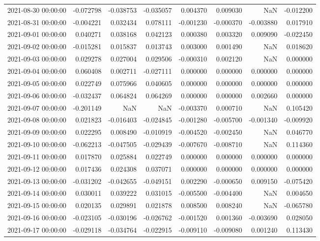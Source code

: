 \begin{tabular}{lrrrrrrr}
2021-08-30 00:00:00 & -0.072798 & -0.038753 & -0.035057 & 0.004370 & 0.009030 & NaN & -0.012200 \\
2021-08-31 00:00:00 & -0.004221 & 0.032434 & 0.078111 & -0.001230 & -0.000370 & -0.003880 & 0.017910 \\
2021-09-01 00:00:00 & 0.040271 & 0.038168 & 0.042123 & 0.000380 & 0.003320 & 0.009090 & -0.022450 \\
2021-09-02 00:00:00 & -0.015281 & 0.015837 & 0.013743 & 0.003000 & 0.001490 & NaN & 0.018620 \\
2021-09-03 00:00:00 & 0.029278 & 0.027004 & 0.029506 & -0.000310 & 0.002120 & NaN & 0.000000 \\
2021-09-04 00:00:00 & 0.060408 & 0.002711 & -0.027111 & 0.000000 & 0.000000 & 0.000000 & 0.000000 \\
2021-09-05 00:00:00 & 0.022749 & 0.075966 & 0.040605 & 0.000000 & 0.000000 & 0.000000 & 0.000000 \\
2021-09-06 00:00:00 & -0.032437 & 0.064824 & 0.064269 & 0.000000 & 0.000000 & 0.002660 & 0.000000 \\
2021-09-07 00:00:00 & -0.201149 & NaN & NaN & -0.003370 & 0.000710 & NaN & 0.105420 \\
2021-09-08 00:00:00 & 0.021823 & -0.016403 & -0.024845 & -0.001280 & -0.005700 & -0.001340 & -0.009920 \\
2021-09-09 00:00:00 & 0.022295 & 0.008490 & -0.010919 & -0.004520 & -0.002450 & NaN & 0.046770 \\
2021-09-10 00:00:00 & -0.062213 & -0.047505 & -0.029439 & -0.007670 & -0.008710 & NaN & 0.114360 \\
2021-09-11 00:00:00 & 0.017870 & 0.025884 & 0.022749 & 0.000000 & 0.000000 & 0.000000 & 0.000000 \\
2021-09-12 00:00:00 & 0.017436 & 0.024308 & 0.037071 & 0.000000 & 0.000000 & 0.000000 & 0.000000 \\
2021-09-13 00:00:00 & -0.031202 & -0.042655 & -0.049151 & 0.002290 & -0.000650 & 0.009150 & -0.075420 \\
2021-09-14 00:00:00 & 0.030011 & 0.039222 & 0.031015 & -0.005500 & -0.004400 & NaN & 0.004650 \\
2021-09-15 00:00:00 & 0.020135 & 0.029891 & 0.021878 & 0.008500 & 0.008240 & NaN & -0.065780 \\
2021-09-16 00:00:00 & -0.023105 & -0.030196 & -0.026762 & -0.001520 & 0.001360 & -0.003690 & 0.028050 \\
2021-09-17 00:00:00 & -0.029118 & -0.034764 & -0.022915 & -0.009110 & -0.009080 & 0.001240 & 0.113430 \\

\end{tabular}
